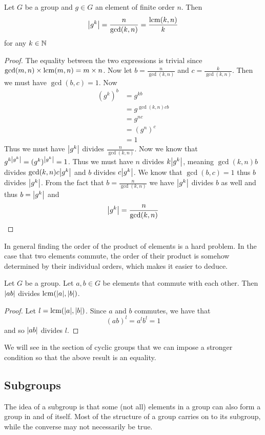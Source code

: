 \documentclass[a4paper]{article}
\begin{document}
\begin{lmm}{}{} Let $G$ be a group and $g\in G$ an element of finite order $n$. Then $$\abs{g^k}=\frac{n}{\gcd(k,n)}=\frac{\operatorname{lcm}(k,n)}{k}$$ for any $k\in\mathbb{N}$
\begin{proof} The equality between the two expressions is trivial since $\gcd(m,n)\times\operatorname{lcm}(m,n)=m\times n$. Now let $b=\frac{n}{\gcd(k,n)}$ and $c=\frac{k}{\gcd(k,n)}$. Then we must have $\gcd(b,c)=1$. Now
\begin{align*}
(g^k)^b&=g^{kb}\\
&=g^{\gcd(k,n)cb}\\
&=g^{nc}\\
&=(g^n)^c\\
&=1
\end{align*}
Thus we must have $\abs{g^k}$ divides $\frac{n}{\gcd(k,n)}$. Now we know that $g^{k\abs{g^k}}=(g^k)^{\abs{g^k}}=1$. Thus we must have $n$ divides $k\abs{g^k}$, meaning $\gcd(k,n)b$ divides $\gcd(k,n)c\abs{g^k}$ and $b$ divides $c\abs{g^k}$. We know that $\gcd(b,c)=1$ thus $b$ divides $\abs{g^k}$. From the fact that $b=\frac{n}{\gcd(k,n)}$ we have $\abs{g^k}$ divides $b$ as well and thus $b=\abs{g^k}$ and $$\abs{g^k}=\frac{n}{\gcd(k,n)}$$
\end{proof}
\end{lmm}

In general finding the order of the product of elements is a hard problem. In the case that two elements commute, the order of their product is somehow determined by their individual orders, which makes it easier to deduce. 

\begin{lmm}{}{} Let $G$ be a group. Let $a,b\in G$ be elements that commute with each other. Then $\abs{ab}$ divides $\operatorname{lcm}(\abs{a},\abs{b})$. 
\begin{proof}
Let $l=\operatorname{lcm}(\abs{a},\abs{b})$. Since $a$ and $b$ commutes, we have that $$(ab)^l=a^lb^l=1$$ and so $\abs{ab}$ divides $l$. 
\end{proof}
\end{lmm}

We will see in the section of cyclic groups that we can impose a stronger condition so that the above result is an equality. 

\subsection{Subgroups}
The idea of a subgroup is that some (not all) elements in a group can also form a group in and of itself. Most of the structure of a group carries on to its subgroup, while the converse may not necessarily be true. 
\end{document}
